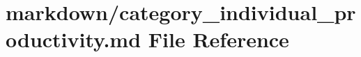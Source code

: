 \hypertarget{category__individual__productivity_8md}{}\section{markdown/category\+\_\+individual\+\_\+productivity.md File Reference}
\label{category__individual__productivity_8md}
